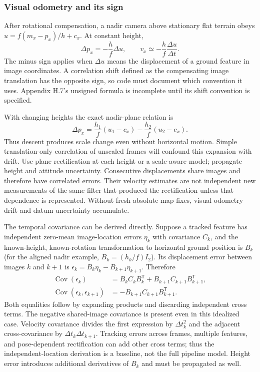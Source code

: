 \subsubsection{Visual odometry and its sign}

After rotational compensation, a nadir camera above stationary flat
terrain obeys $u=f(m_x-p_x)/h+c_x$. At constant height,
\begin{equation}
 \Delta p_x=-\frac h f\Delta u,\qquad
 v_x\simeq-\frac h f\frac{\Delta u}{\Delta t}.
 \label{eq:vo-sign}
\end{equation}
The minus sign applies when $\Delta u$ means the displacement of a
ground feature in image coordinates. A correlation shift defined as
the compensating image translation has the opposite sign, so code
must document which convention it uses. Appendix H.7's unsigned
formula is incomplete until its shift convention is specified.

With changing heights the exact nadir-plane relation is
\begin{equation}
 \Delta p_x=\frac{h_1}{f}(u_1-c_x)-\frac{h_2}{f}(u_2-c_x).
\end{equation}
Thus descent produces scale change even without horizontal motion.
Simple translation-only correlation of unscaled frames will confound
this expansion with drift. Use plane rectification at each height or
a scale-aware model; propagate height and attitude uncertainty.
Consecutive displacements share images and therefore have correlated
errors. Their velocity estimates are not independent new measurements
of the same filter that produced the rectification unless that
dependence is represented. Without fresh absolute map fixes, visual
odometry drift and datum uncertainty accumulate.

The temporal covariance can be derived directly. Suppose a tracked
feature has independent zero-mean image-location errors $\eta_k$ with
covariance $C_k$, and the known-height, known-rotation transformation to
horizontal ground position is $B_k$ (for the aligned nadir example,
$B_k=(h_k/f)I_2$). Its displacement error between images $k$ and $k+1$
is $\epsilon_k=B_k\eta_k-B_{k+1}\eta_{k+1}$. Therefore
\begin{align}
 \operatorname{Cov}(\epsilon_k)
 &=B_kC_kB_k^{\mathsf T}+B_{k+1}C_{k+1}B_{k+1}^{\mathsf T},\\
 \operatorname{Cov}(\epsilon_k,\epsilon_{k+1})
 &=-B_{k+1}C_{k+1}B_{k+1}^{\mathsf T}.
 \label{eq:vo-temporal-covariance}
\end{align}
Both equalities follow by expanding products and discarding independent
cross terms. The negative shared-image covariance is present even in
this idealized case. Velocity covariance divides the first expression
by $\Delta t_k^2$ and the adjacent cross-covariance by
$\Delta t_k\Delta t_{k+1}$. Tracking errors across frames, multiple
features, and pose-dependent rectification can add other cross terms;
thus the independent-location derivation is a baseline, not the full
pipeline model. Height error introduces additional derivatives of
$B_k$ and must be propagated as well.

